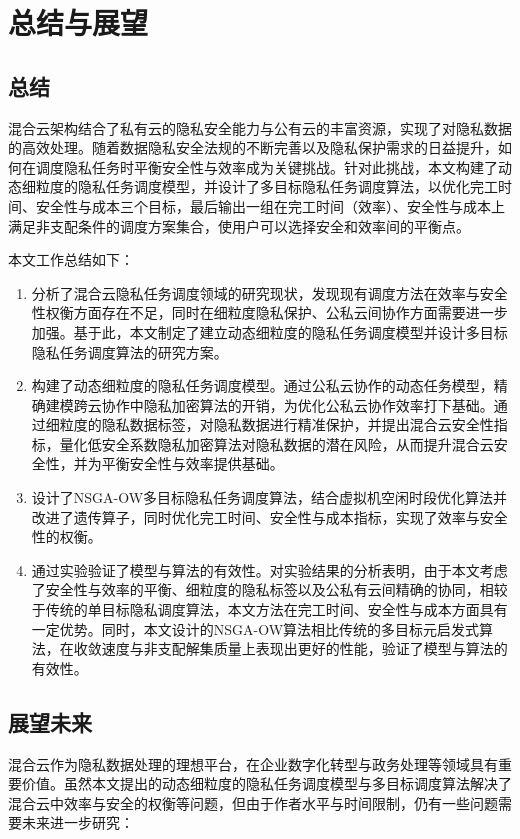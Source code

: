 \chapter{总结与展望}\label{chapter:conclusion}

\section{总结}

混合云架构结合了私有云的隐私安全能力与公有云的丰富资源，实现了对隐私数据的高效处理。随着数据隐私安全法规的不断完善以及隐私保护需求的日益提升，如何在调度隐私任务时平衡安全性与效率成为关键挑战。针对此挑战，本文构建了动态细粒度的隐私任务调度模型，并设计了多目标隐私任务调度算法，以优化完工时间、安全性与成本三个目标，最后输出一组在完工时间（效率）、安全性与成本上满足非支配条件的调度方案集合，使用户可以选择安全和效率间的平衡点。

本文工作总结如下：

\begin{enumerate}
    \item 分析了混合云隐私任务调度领域的研究现状，发现现有调度方法在效率与安全性权衡方面存在不足，同时在细粒度隐私保护、公私云间协作方面需要进一步加强。基于此，本文制定了建立动态细粒度的隐私任务调度模型并设计多目标隐私任务调度算法的研究方案。
    \item 构建了动态细粒度的隐私任务调度模型。通过公私云协作的动态任务模型，精确建模跨云协作中隐私加密算法的开销，为优化公私云协作效率打下基础。通过细粒度的隐私数据标签，对隐私数据进行精准保护，并提出混合云安全性指标，量化低安全系数隐私加密算法对隐私数据的潜在风险，从而提升混合云安全性，并为平衡安全性与效率提供基础。
    \item 设计了NSGA-OW多目标隐私任务调度算法，结合虚拟机空闲时段优化算法并改进了遗传算子，同时优化完工时间、安全性与成本指标，实现了效率与安全性的权衡。
    \item 通过实验验证了模型与算法的有效性。对实验结果的分析表明，由于本文考虑了安全性与效率的平衡、细粒度的隐私标签以及公私有云间精确的协同，相较于传统的单目标隐私调度算法，本文方法在完工时间、安全性与成本方面具有一定优势。同时，本文设计的NSGA-OW算法相比传统的多目标元启发式算法，在收敛速度与非支配解集质量上表现出更好的性能，验证了模型与算法的有效性。
\end{enumerate}

\section{展望未来}

混合云作为隐私数据处理的理想平台，在企业数字化转型与政务处理等领域具有重要价值。虽然本文提出的动态细粒度的隐私任务调度模型与多目标调度算法解决了混合云中效率与安全的权衡等问题，但由于作者水平与时间限制，仍有一些问题需要未来进一步研究：

